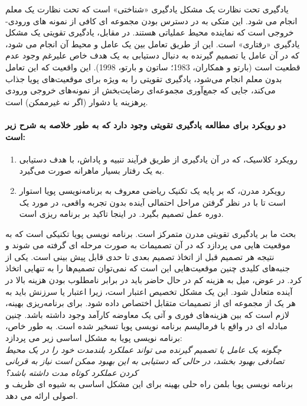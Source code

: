 \documentclass[oneside, 11pt, a4paper]{book}
\begin{document}
یادگیری تحت نظارت یک مشکل یادگیری «شناختی» است که تحت نظارت یک معلم انجام می شود. این متکی به در دسترس بودن مجموعه ای کافی از نمونه های ورودی-خروجی است که نماینده محیط عملیاتی هستند. در مقابل، یادگیری تقویتی یک مشکل یادگیری «رفتاری» است. این از طریق تعامل بین یک عامل و محیط آن انجام می شود، که در آن عامل یا تصمیم گیرنده به دنبال دستیابی به یک هدف خاص علیرغم وجود عدم قطعیت است (بارتو و همکاران، 1983؛ ساتون و بارتو، 1998). این واقعیت که این تعامل بدون معلم انجام می‌شود، یادگیری تقویتی را به ویژه برای موقعیت‌های پویا جذاب می‌کند، جایی که جمع‌آوری مجموعه‌ای رضایت‌بخش از نمونه‌های خروجی ورودی پرهزینه یا دشوار (اگر نه غیرممکن) است.

\paragraph{دو رویکرد برای مطالعه یادگیری تقویتی وجود دارد که به طور خلاصه به شرح زیر است:}

\begin{enumerate}
    \item رویکرد کلاسیک، که در آن یادگیری از طریق فرآیند تنبیه و پاداش، با هدف دستیابی به یک رفتار بسیار ماهرانه صورت می‌گیرد.
    \item رویکرد مدرن، که بر پایه یک تکنیک ریاضی معروف به برنامه‌نویسی پویا استوار است تا با در نظر گرفتن مراحل احتمالی آینده بدون تجربه واقعی، در مورد یک دوره عمل تصمیم بگیرد. در اینجا تاکید بر برنامه ریزی است.
\end{enumerate}

بحث ما بر یادگیری تقویتی مدرن متمرکز است. برنامه نویسی پویا تکنیکی است که به موقعیت هایی می پردازد که در آن تصمیمات به صورت مرحله ای گرفته می شوند و نتیجه هر تصمیم قبل از اتخاذ تصمیم بعدی تا حدی قابل پیش بینی است. یکی از جنبه‌های کلیدی چنین موقعیت‌هایی این است که نمی‌توان تصمیم‌ها را به تنهایی اتخاذ کرد. در عوض، میل به هزینه کم در حال حاضر باید در برابر نامطلوب بودن هزینه بالا در آینده متعادل شود. این یک مشکل تخصیص اعتبار است، زیرا اعتبار یا سرزنش باید به هر یک از مجموعه ای از تصمیمات متقابل اختصاص داده شود. برای برنامه‌ریزی بهینه، لازم است که بین هزینه‌های فوری و آتی یک معاوضه کارآمد وجود داشته باشد. چنین مبادله ای در واقع با فرمالیسم برنامه نویسی پویا تسخیر شده است. به طور خاص، برنامه نویسی پویا به مشکل اساسی زیر می پردازد:\\\indent\emph{\color{blue}
چگونه یک عامل یا تصمیم گیرنده می تواند عملکرد بلندمدت خود را در یک محیط تصادفی بهبود بخشد، در حالی که دستیابی به این بهبود ممکن است نیاز به قربانی کردن عملکرد کوتاه مدت داشته باشد؟
}\\برنامه نویسی پویا بلمن راه حلی بهینه برای این مشکل اساسی به شیوه ای ظریف و اصولی ارائه می دهد.
\end{document}
